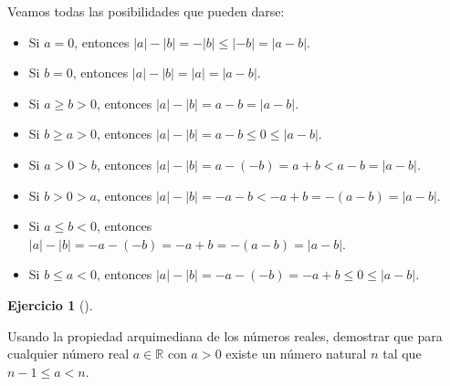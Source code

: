 \documentclass[
  a4paper,
]{scrreport}
\providecommand{\tightlist}{%
  \setlength{\itemsep}{0pt}\setlength{\parskip}{0pt}}\usepackage{longtable,booktabs,array}
\theoremstyle{definition}
\newtheorem{exercise}{Ejercicio}[chapter]
\theoremstyle{remark}
\begin{document}
\begin{tcolorbox}[enhanced jigsaw, breakable, title=\textcolor{quarto-callout-tip-color}{\faLightbulb}\hspace{0.5em}{Solución}, left=2mm, leftrule=.75mm, colback=white, bottomtitle=1mm, coltitle=black, bottomrule=.15mm, colframe=quarto-callout-tip-color-frame, colbacktitle=quarto-callout-tip-color!10!white, rightrule=.15mm, opacitybacktitle=0.6, arc=.35mm, toprule=.15mm, opacityback=0, toptitle=1mm, titlerule=0mm]

Veamos todas las posibilidades que pueden darse:

\begin{itemize}
\tightlist
\item
  Si \(a=0\), entonces \(|a|-|b|= -|b|\leq |-b| = |a-b|\).
\item
  Si \(b=0\), entonces \(|a|-|b|=|a|= |a-b|\).
\item
  Si \(a\geq b>0\), entonces \(|a|-|b|=a-b=|a-b|\).
\item
  Si \(b\geq a>0\), entonces \(|a|-|b|=a-b\leq 0\leq |a-b|\).
\item
  Si \(a>0>b\), entonces \(|a|-|b| = a-(-b) =a+b < a-b =|a-b|\).
\item
  Si \(b>0>a\), entonces \(|a|-|b| = -a-b < -a+b = -(a-b) = |a-b|\).
\item
  Si \(a\leq b<0\), entonces
  \(|a|-|b| = -a-(-b) = -a+b = -(a-b) = |a-b|\).
\item
  Si \(b\leq a<0\), entonces
  \(|a|-|b| = -a-(-b) = -a+b \leq 0 \leq |a-b|\).
\end{itemize}

\end{tcolorbox}

\leavevmode{}%
\begin{exercise}[]\label{exr-propiedad-arquimediana-1}

Usando la propiedad arquimediana de los números reales, demostrar que
para cualquier número real \(a\in\mathbb{R}\) con \(a>0\) existe un
número natural \(n\) tal que \(n-1\leq a< n\).

\end{exercise}
\end{document}
